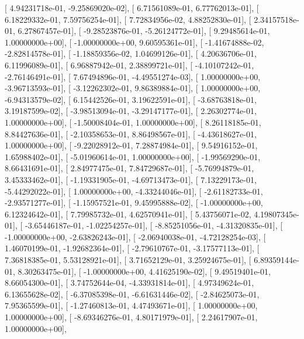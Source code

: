 \documentclass{article}
\begin{document}
       [  4.94231718e-01,  -9.25869020e-02],
       [  6.71561089e-01,   6.77762013e-01],
       [  6.18229332e-01,   7.59756254e-01],
       [  7.72834956e-02,   4.88252830e-01],
       [  2.34157518e-01,   6.27867457e-01],
       [ -9.28523876e-01,  -5.26124772e-01],
       [  9.29485614e-01,   1.00000000e+00],
       [ -1.00000000e+00,   9.60595361e-01],
       [ -1.41674888e-02,  -2.82814578e-01],
       [ -1.18859356e-02,   1.04699126e-01],
       [  4.20636706e-01,   6.11996089e-01],
       [  6.96887942e-01,   2.38899721e-01],
       [ -4.10107242e-01,  -2.76146491e-01],
       [  7.67494896e-01,  -4.49551274e-03],
       [  1.00000000e+00,  -3.96713593e-01],
       [ -3.12262302e-01,   9.86389884e-01],
       [  1.00000000e+00,  -6.94313579e-02],
       [  6.15442526e-01,   3.19622591e-01],
       [ -3.68763818e-01,   3.19187599e-02],
       [ -3.98513094e-01,  -3.29147177e-01],
       [  2.26302774e-01,   1.00000000e+00],
       [ -1.50008404e-01,   1.00000000e+00],
       [  8.26118185e-01,   8.84427636e-01],
       [ -2.10358653e-01,   8.86498567e-01],
       [ -4.43618627e-01,   1.00000000e+00],
       [ -9.22028912e-01,   7.28874984e-01],
       [  9.54916152e-01,   1.65988402e-01],
       [ -5.01960614e-01,   1.00000000e+00],
       [ -1.99569290e-01,   8.66431691e-01],
       [  2.84977475e-01,   7.84729687e-01],
       [ -5.76994879e-01,   3.45333462e-01],
       [ -1.19331905e-01,  -4.69713473e-01],
       [  7.13229173e-01,  -5.44292022e-01],
       [  1.00000000e+00,  -4.33244046e-01],
       [ -2.61182733e-01,  -2.93571277e-01],
       [ -1.15957521e-01,   9.45995888e-02],
       [ -1.00000000e+00,   6.12324642e-01],
       [  7.79985732e-01,   4.62570941e-01],
       [  5.43756071e-02,   4.19807345e-01],
       [ -3.65446187e-01,  -1.02254257e-01],
       [ -8.85251056e-01,  -4.31320835e-01],
       [ -1.00000000e+00,  -2.63826243e-01],
       [ -2.06940038e-01,  -4.72128254e-03],
       [  1.46070199e-01,  -1.92682364e-01],
       [ -2.79610767e-01,  -3.17577113e-01],
       [  7.36818385e-01,   5.53128921e-01],
       [  3.71652129e-01,   3.25924675e-01],
       [  6.89359144e-01,   8.30263475e-01],
       [ -1.00000000e+00,   4.41625190e-02],
       [  9.49519401e-01,   8.66054300e-01],
       [  3.74752644e-04,  -4.33931814e-01],
       [  4.97349624e-01,   6.13655628e-02],
       [ -6.37085398e-01,  -6.61631446e-02],
       [ -2.84625073e-01,   7.95365599e-01],
       [ -1.27460813e-01,   4.47493671e-01],
       [  1.00000000e+00,   1.00000000e+00],
       [ -8.69346276e-01,   4.80171979e-01],
       [  2.24617907e-01,   1.00000000e+00],
\end{document}

